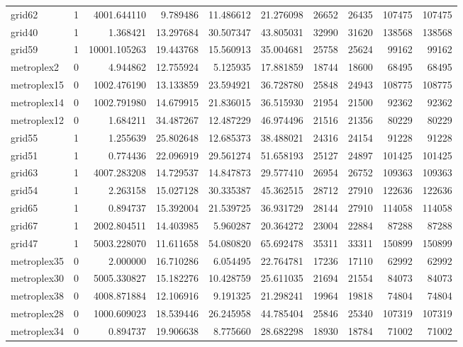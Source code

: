 \begin{longtable}{|l|r|r|r|r|r|r|r|r|r|}
grid62 & 1 & 4001.644110 & 9.789486 & 11.486612 & 21.276098 & 26652 & 26435 & 107475 & 107475 \\
grid40 & 1 & 1.368421 & 13.297684 & 30.507347 & 43.805031 & 32990 & 31620 & 138568 & 138568 \\
grid59 & 1 & 10001.105263 & 19.443768 & 15.560913 & 35.004681 & 25758 & 25624 & 99162 & 99162 \\
metroplex2 & 0 & 4.944862 & 12.755924 & 5.125935 & 17.881859 & 18744 & 18600 & 68495 & 68495 \\
metroplex15 & 0 & 1002.476190 & 13.133859 & 23.594921 & 36.728780 & 25848 & 24943 & 108775 & 108775 \\
metroplex14 & 0 & 1002.791980 & 14.679915 & 21.836015 & 36.515930 & 21954 & 21500 & 92362 & 92362 \\
metroplex12 & 0 & 1.684211 & 34.487267 & 12.487229 & 46.974496 & 21516 & 21356 & 80229 & 80229 \\
grid55 & 1 & 1.255639 & 25.802648 & 12.685373 & 38.488021 & 24316 & 24154 & 91228 & 91228 \\
grid51 & 1 & 0.774436 & 22.096919 & 29.561274 & 51.658193 & 25127 & 24897 & 101425 & 101425 \\
grid63 & 1 & 4007.283208 & 14.729537 & 14.847873 & 29.577410 & 26954 & 26752 & 109363 & 109363 \\
grid54 & 1 & 2.263158 & 15.027128 & 30.335387 & 45.362515 & 28712 & 27910 & 122636 & 122636 \\
grid65 & 1 & 0.894737 & 15.392004 & 21.539725 & 36.931729 & 28144 & 27910 & 114058 & 114058 \\
grid67 & 1 & 2002.804511 & 14.403985 & 5.960287 & 20.364272 & 23004 & 22884 & 87288 & 87288 \\
grid47 & 1 & 5003.228070 & 11.611658 & 54.080820 & 65.692478 & 35311 & 33311 & 150899 & 150899 \\
metroplex35 & 0 & 2.000000 & 16.710286 & 6.054495 & 22.764781 & 17236 & 17110 & 62992 & 62992 \\
metroplex30 & 0 & 5005.330827 & 15.182276 & 10.428759 & 25.611035 & 21694 & 21554 & 84073 & 84073 \\
metroplex38 & 0 & 4008.871884 & 12.106916 & 9.191325 & 21.298241 & 19964 & 19818 & 74804 & 74804 \\
metroplex28 & 0 & 1000.609023 & 18.539446 & 26.245958 & 44.785404 & 25846 & 25340 & 107319 & 107319 \\
metroplex34 & 0 & 0.894737 & 19.906638 & 8.775660 & 28.682298 & 18930 & 18784 & 71002 & 71002 \\

\end{longtable}
